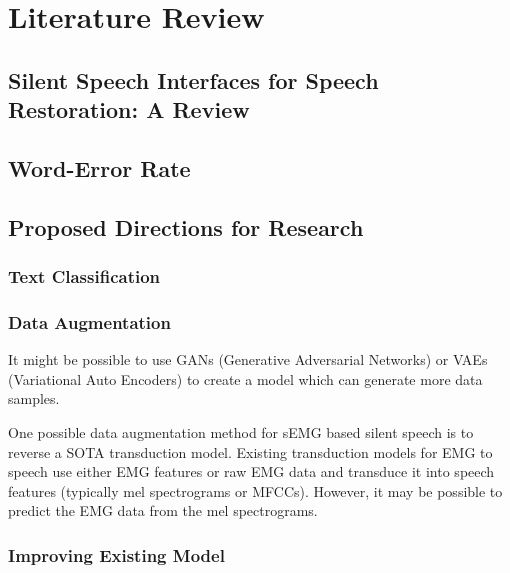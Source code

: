 \iffalse

Mu-Law compression:
- compresses audio signal into discrete bins whilst preserving dynamic range

Current sEMG Silent Speech Text Classification Research:
- https://dspace.mit.edu/bitstream/handle/1721.1/123121/1128187233-MIT.pdf?sequence=1&isAllowed=y

\fi

\chapter{Literature Review} \label{chap:lit-review}

\section{Silent Speech Interfaces for Speech Restoration: A Review}

\section{Word-Error Rate}



\section{Proposed Directions for Research}

\subsection{Text Classification}

\subsection{Data Augmentation}

It might be possible to use GANs (Generative Adversarial Networks) or
VAEs (Variational Auto Encoders) to create a model which can generate
more data samples.

One possible data augmentation method for sEMG based silent speech is to
reverse a SOTA transduction model. Existing transduction models for
EMG to speech use either EMG features or raw EMG data and transduce
it into speech features (typically mel spectrograms or MFCCs). However,
it may be possible to predict the EMG data from the mel spectrograms.

\subsection{Improving Existing Model}

